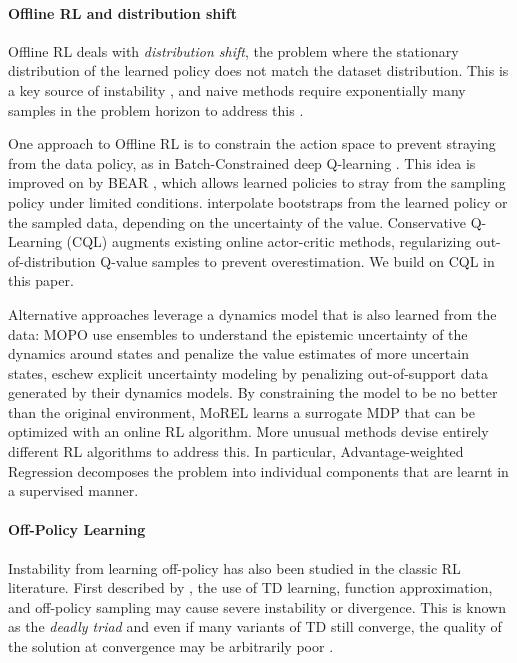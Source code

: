 \paragraph{Offline RL and distribution shift}
Offline RL deals with \emph{distribution shift}, the problem where the stationary distribution of the learned policy does not match the dataset distribution. This is a key source of instability \citep{chen2019information,levine2020survey}, and naive methods require exponentially many samples in the problem horizon to address this \citep{wang2020statistical}.

One approach to Offline RL is to constrain the action space to prevent straying from the data policy, as in Batch-Constrained deep Q-learning \citep{fujimoto2019off}. This idea is improved on by BEAR \citep{kumar2019stabilizing}, which allows learned policies to stray from the sampling policy under limited conditions. \citet{laroche2019safe} interpolate bootstraps from the learned policy or the sampled data, depending on the uncertainty of the value. Conservative Q-Learning (CQL) \citep{kumar2020cql} augments existing online actor-critic methods, regularizing out-of-distribution Q-value samples to prevent overestimation. We build on CQL in this paper.

Alternative approaches leverage a dynamics model that is also learned from the data: MOPO \citep{yu2020mopo} use ensembles to understand the epistemic uncertainty of the dynamics around states and penalize the value estimates of more uncertain states, \citet{tianhe2021combo} eschew explicit uncertainty modeling by penalizing out-of-support data generated by their dynamics models. By constraining the model to be no better than the original environment, MoREL \citep{kidambi2020morel} learns a surrogate MDP that can be optimized with an online RL algorithm. More unusual methods devise entirely different RL algorithms to address this. In particular, Advantage-weighted Regression \citep{peng2019advantage} decomposes the problem into individual components that are learnt in a supervised manner.

\paragraph{Off-Policy Learning} Instability from learning off-policy has also been studied in the classic RL literature.
First described by \citet{tsitsiklis1996analysis}, the use of TD learning, function approximation, and off-policy sampling may cause severe instability or divergence. This is known as the \emph{deadly triad} \citep[p.~264]{sutton2020reinforcement} and even if many variants of TD still converge, the quality of the solution at convergence may be arbitrarily poor \citep{kolter2011fixed}.



